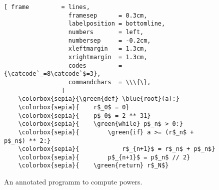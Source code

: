 \begin{figure}[!h]
\centering
\begin{Verbatim}[ frame         = lines, 
                  framesep      = 0.3cm, 
                  labelposition = bottomline,
                  numbers       = left,
                  numbersep     = -0.2cm,
                  xleftmargin   = 1.3cm,
                  xrightmargin  = 1.3cm,
                  codes         = {\catcode`_=8\catcode`$=3},
                  commandchars  = \\\{\},
                ]
    \colorbox{sepia}{\green{def} \blue{root}(a):}
    \colorbox{sepia}{    r$_0$ = 0}
    \colorbox{sepia}{    p$_0$ = 2 ** 31}
    \colorbox{sepia}{    \green{while} p$_n$ > 0:}
    \colorbox{sepia}{        \green{if} a >= (r$_n$ + p$_n$) ** 2:}
    \colorbox{sepia}{            r$_{n+1}$ = r$_n$ + p$_n$}
    \colorbox{sepia}{        p$_{n+1}$ = p$_n$ // 2}
    \colorbox{sepia}{    \green{return} r$_N$}
\end{Verbatim}
\vspace*{-0.3cm}
\caption{An annotated programm to compute powers.}
\label{fig:Integer-Square-Root-Iterative.ipynb}
\end{figure} %

